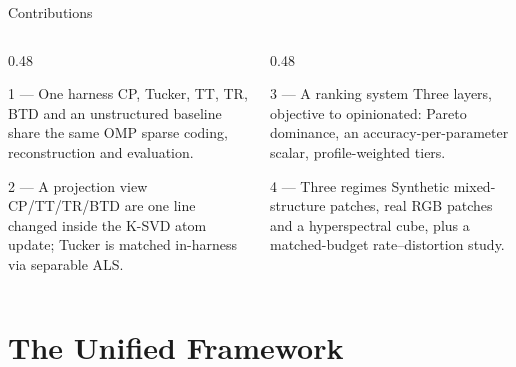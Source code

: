 \documentclass[aspectratio=169,9pt]{beamer}
\begin{document}
\begin{frame}{Contributions}
\begin{columns}[T,onlytextwidth]
\begin{column}{0.48\textwidth}
\begin{block}{1 --- One harness}
\small CP, Tucker, TT, TR, BTD and an unstructured baseline share the same OMP
sparse coding, reconstruction and evaluation.
\end{block}
\begin{block}{2 --- A projection view}
\small CP/TT/TR/BTD are one line changed inside the K-SVD atom update; Tucker is
matched in-harness via separable ALS.
\end{block}
\end{column}
\begin{column}{0.48\textwidth}
\begin{block}{3 --- A ranking system}
\small Three layers, objective to opinionated: Pareto dominance, an
accuracy-per-parameter scalar, profile-weighted tiers.
\end{block}
\begin{block}{4 --- Three regimes}
\small Synthetic mixed-structure patches, real RGB patches and a hyperspectral
cube, plus a matched-budget rate--distortion study.
\end{block}
\end{column}
\end{columns}
\end{frame}

\section{The Unified Framework}
\end{document}
